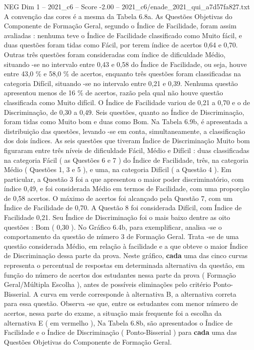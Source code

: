 \begin{textsample}{NEG Dim 1 – 2021\_c6 – Score -2.00 – 2021\_c6/enade\_2021\_qui\_a7d57fa827.txt}
A convenção das cores é a mesma da Tabela 6.8a.
As Questões Objetivas do Componente de Formação Geral, segundo o Índice de Facilidade, foram assim avaliadas : nenhuma teve o Índice de Facilidade classificado como Muito fácil, e duas questões foram tidas como Fácil, por terem índice de acertos 0,64 e 0,70.
Outras três questões foram consideradas com índice de dificuldade Médio, situando -se no intervalo entre 0,43 e 0,58 do Índice de Facilidade, ou seja, houve entre 43,0 \% e 58,0 \% de acertos, enquanto três questões foram classificadas na categoria Difícil, situando -se no intervalo entre 0,21 e 0,39.
Nenhuma questão apresentou menos de 16 \% de acertos, razão pela qual não houve questão classificada como Muito difícil.
O Índice de Facilidade variou de 0,21 a 0,70 e o de Discriminação, de 0,30 a 0,49.
Seis questões, quanto ao Índice de Discriminação, foram tidas como Muito bom e duas como Bom.
Na Tabela 6.9b, é apresentada a distribuição das questões, levando -se em conta, simultaneamente, a classificação dos dois índices.
As seis questões que tiveram Índice de Discriminação Muito bom figuraram entre três níveis de dificuldade Fácil, Médio e Difícil : duas classificadas na categoria Fácil ( as Questões 6 e 7 ) do Índice de Facilidade, três, na categoria Médio ( Questões 1, 3 e 5 ), e uma, na categoria Difícil ( a Questão 4 ).
Em particular, a Questão 3 foi a que apresentou o maior poder discriminatório, com índice 0,49, e foi considerada Médio em termos de Facilidade, com uma proporção de 0,58 acertos.
O máximo de acertos foi alcançado pela Questão 7, com um Índice de Facilidade de 0,70.
A Questão 8 foi considerada Difícil, com Índice de Facilidade 0,21.
Seu Índice de Discriminação foi o mais baixo dentre as oito questões : Bom ( 0,30 ).
No Gráfico 6.4b, para exemplificar, analisa -se o comportamento da questão de número 3 de Formação Geral.
Trata -se de uma questão considerada Médio, em relação à facilidade e a que obteve o maior Índice de Discriminação dessa parte da prova.
Neste gráfico, \textbf{cada} uma das cinco curvas representa o percentual de respostas em determinada alternativa da questão, em função do número de acertos dos estudantes nessa parte da prova ( Formação Geral/Múltipla Escolha ), antes de possíveis eliminações pelo critério Ponto-Bisserial.
A curva em verde corresponde à alternativa B, a alternativa correta para essa questão.
Observa -se que, entre os estudantes com menor número de acertos, nessa parte do exame, a situação mais frequente foi a escolha da alternativa E ( em vermelho ), Na Tabela 6.8b, são apresentados o Índice de Facilidade e o Índice de Discriminação ( Ponto-Bisserial ) para \textbf{cada} uma das Questões Objetivas do Componente de Formação Geral.

\end{textsample}
